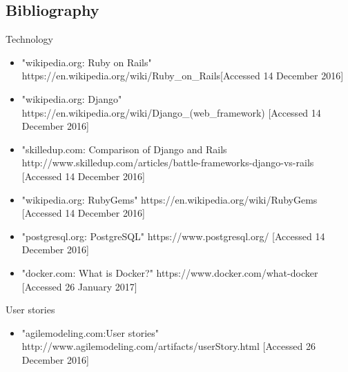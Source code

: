 \documentclass{l3proj}
\begin{document}


\pagebreak

{}





\iffalse


\subsection{Bibliography}
\label{Bibliography}


\label{tech}
Technology
\begin{itemize}

\item "wikipedia.org: Ruby on Rails"
\newline https://en.wikipedia.org/wiki/Ruby\_on\_Rails[Accessed 14 December 2016]

\item "wikipedia.org: Django"
\newline https://en.wikipedia.org/wiki/Django\_(web\_framework) [Accessed 14 December 2016]

\item "skilledup.com: Comparison of Django and Rails
\newline http://www.skilledup.com/articles/battle-frameworks-django-vs-rails [Accessed 14 December 2016]

\item "wikipedia.org: RubyGems"
\newline https://en.wikipedia.org/wiki/RubyGems [Accessed 14 December 2016]

\item "postgresql.org: PostgreSQL"
\newline https://www.postgresql.org/ [Accessed 14 December 2016]

\item "docker.com: What is Docker?"
\newline https://www.docker.com/what-docker [Accessed 26 January 2017]


\end{itemize}




\label{user_stories}

User stories

\begin{itemize}

\item "agilemodeling.com:User stories"
\newline http://www.agilemodeling.com/artifacts/userStory.html [Accessed 26 December 2016]

\end{itemize}
\end{document}

